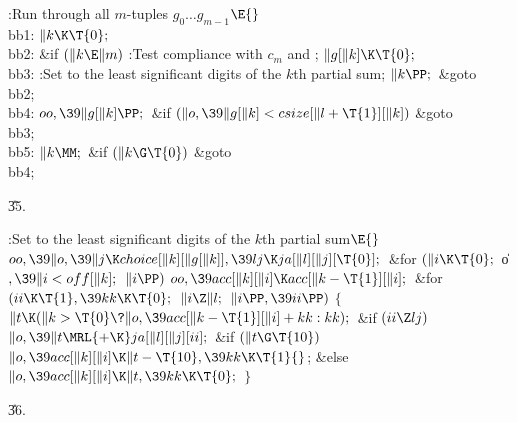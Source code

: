 \B{}:Run through all $m$-tuples $g_0%
\ldots g_{m-1}$\X${}\E{}$\6
\4\\{bb1}:\5
${}\|k\K\T{0};{}$\6
\4\\{bb2}:\5
\&{if} ${}(\|k\E\|m){}$\1\5
:Test compliance with $c_m$ and \X;\2\6
${}\|g[\|k]\K\T{0};{}$\6
\4\\{bb3}:\5
:Set  to the least significant digits of the $k$th partial
sum\X;\6
${}\|k\PP;{}$\6
\&{goto} \\{bb2};\6
\4\\{bb4}:\5
${}\\{oo},\39\|g[\|k]\PP;{}$\6
\&{if} ${}(\|o,\39\|g[\|k]<\\{csize}[\|l+\T{1}][\|k]){}$\1\5
\&{goto} \\{bb3};\2\6
\4\\{bb5}:\5
${}\|k\MM;{}$\6
\&{if} ${}(\|k\G\T{0}){}$\1\5
\&{goto} \\{bb4};\2\par
\U35.\fi

\B{}:Set  to the least
significant digits of the $k$th partial sum\X${}\E{}$\6
$\\{oo},\39\|o,\39\|j\K\\{choice}[\|k][\|g[\|k]],\39\\{lj}\K\\{ja}[\|l][\|j][%
\T{0}];{}$\6
\&{for} ${}(\|i\K\T{0};{}$ \|o${},\39\|i<\\{off}[\|k];{}$ ${}\|i\PP){}$\1\5
${}\\{oo},\39\\{acc}[\|k][\|i]\K\\{acc}[\|k-\T{1}][\|i];{}$\2\6
\&{for} ${}(\\{ii}\K\T{1},\39\\{kk}\K\T{0};{}$ ${}\|i\Z\|l;{}$ ${}\|i\PP,\39%
\\{ii}\PP){}$\5
${}\{{}$\1\6
${}\|t\K(\|k>\T{0}\?\|o,\39\\{acc}[\|k-\T{1}][\|i]+\\{kk}:\\{kk});{}$\6
\&{if} ${}(\\{ii}\Z\\{lj}){}$\1\5
${}\|o,\39\|t\MRL{+{\K}}\\{ja}[\|l][\|j][\\{ii}];{}$\2\6
\&{if} ${}(\|t\G\T{10}){}$\1\5
${}\|o,\39\\{acc}[\|k][\|i]\K\|t-\T{10},\39\\{kk}\K\T{1}{}$;\5
\2\&{else}\1\5
${}\|o,\39\\{acc}[\|k][\|i]\K\|t,\39\\{kk}\K\T{0};{}$\2\6
\4${}\}{}$\2\par
\U36.\fi

